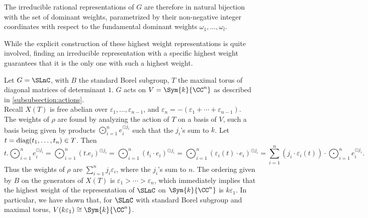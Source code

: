The irreducible rational representations of $G$ are therefore in natural bijection with the set of dominant weights, parametrized by their non-negative integer coordinates with respect to the fundamental dominant weights $\omega_1, \ldots, \omega_l$.

While the explicit construction of these highest weight representations is quite involved, finding an irreducible representation with a specific highest weight guarantees that it is the only one with such a highest weight.

\begin{exmp}
    Let $G = \SLnC$, with $B$ the standard Borel subgroup, $T$ the maximal torus of diagonal matrices of determinant $1$. $G$ acts on $V = \Sym{k}{\CC^n}$ as described in \cref{subsubsection:actions}.\\
    Recall $X(T)$ is free abelian over $\varepsilon_1, \ldots, \varepsilon_{n-1}$, and $\varepsilon_n = - (\varepsilon_1 + \cdots + \varepsilon_{n-1})$. \\
    The weights of $\rho$ are found by analyzing the action of $T$ on a basis of $V$, such a basis being given by products $\bigodot_{i = 1}^n e_i^{\odot j_i}$ such that the $j_i$'s sum to $k$. Let $t = \textnormal{diag}(t_1, \ldots, t_n) \in T$. Then
    \[ t . \bigodot_{i = 1}^n e_i^{\odot j_i} = \bigodot_{i = 1}^n {(t.e_i)}^{\odot j_i} = \bigodot_{i = 1}^n {(t_i \cdot e_i)}^{\odot j_i} = \bigodot_{i = 1}^n {(\varepsilon_i(t) \cdot e_i)}^{\odot j_i} = \sum_{i=1}^{n}(j_i \cdot \varepsilon_i(t)) \cdot \bigodot_{i = 1}^n e_i^{\odot j_i}.\]   
    Thus the weights of $\rho$ are $\sum_{i = 1}^{n} j_i \varepsilon_i$, where the $j_i$'s sum to $n$. The ordering given by $B$ on the generators of $X(T)$ is $\varepsilon_1 > \cdots > \varepsilon_n$, which immediately implies that the highest weight of the representation of $\SLnC$ on $\Sym{k}{\CC^n}$ is $k \varepsilon_1$. In particular, we have shown that, for $\SLnC$ with standard Borel subgroup and maximal torus, $V(k \varepsilon_1) \cong \Sym{k}{\CC^n}$.
\end{exmp}
